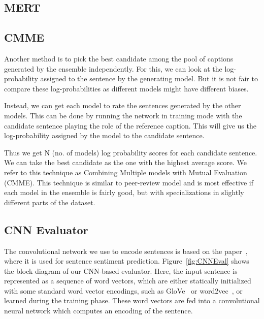 \subsection{MERT}
\subsection{CMME}

Another method is to pick the best candidate among the pool of captions
generated by the ensemble independently.
For this, we can look at the log-probability assigned to the sentence by the
generating model.
But it is not fair to compare these log-probabilities as different models might
have different biases.

Instead, we can get each model to rate the sentences generated by the other
models.
This can be done by running the network in training mode with the candidate
sentence playing the role of the reference caption.
This will give us the log-probability assigned by the model to the candidate
sentence.

Thus we get N (no. of models) log probability scores for each candidate
sentence.
We can take the best candidate as the one with the highest average score.
We refer to this technique as Combining Multiple models with Mutual Evaluation
(CMME).
This technique is similar to peer-review model and is most effective if each
model in the ensemble is fairly good, but with specializations in slightly
different parts of the dataset.

\subsection{CNN Evaluator}

The convolutional network we use to encode sentences is based on the
paper~\cite{kim:2014:CNNsent}, where it is used for sentence sentiment
prediction.
Figure~\ref{fig:CNNEval} shows the block diagram of our CNN-based
evaluator.  
Here, the input sentence is represented as a sequence of word vectors,
which are either statically initialized with some standard word vector
encodings, such as GloVe~\cite{pennington2014glove} or
word2vec~\cite{mikolov2013distributed}, or learned during the training
phase.
These word vectors are fed into a convolutional neural network which
computes an encoding of the sentence.

